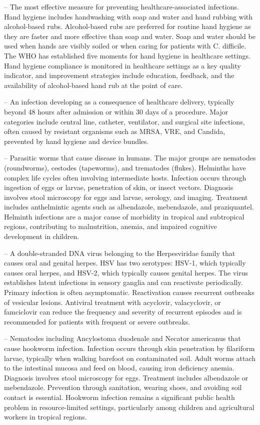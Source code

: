 -- The most effective measure for preventing healthcare-associated infections. Hand hygiene includes handwashing with soap and water and hand rubbing with alcohol-based rubs. Alcohol-based rubs are preferred for routine hand hygiene as they are faster and more effective than soap and water. Soap and water should be used when hands are visibly soiled or when caring for patients with C. difficile. The WHO has established five moments for hand hygiene in healthcare settings. Hand hygiene compliance is monitored in healthcare settings as a key quality indicator, and improvement strategies include education, feedback, and the availability of alcohol-based hand rub at the point of care.

-- An infection developing as a consequence of healthcare delivery, typically beyond 48 hours after admission or within 30 days of a procedure. Major categories include central line, catheter, ventilator, and surgical site infections, often caused by resistant organisms such as MRSA, VRE, and Candida, prevented by hand hygiene and device bundles.

-- Parasitic worms that cause disease in humans. The major groups are nematodes (roundworms), cestodes (tapeworms), and trematodes (flukes). Helminths have complex life cycles often involving intermediate hosts. Infection occurs through ingestion of eggs or larvae, penetration of skin, or insect vectors. Diagnosis involves stool microscopy for eggs and larvae, serology, and imaging. Treatment includes anthelmintic agents such as albendazole, mebendazole, and praziquantel. Helminth infections are a major cause of morbidity in tropical and subtropical regions, contributing to malnutrition, anemia, and impaired cognitive development in children.

-- A double-stranded DNA virus belonging to the Herpesviridae family that causes oral and genital herpes. HSV has two serotypes: HSV-1, which typically causes oral herpes, and HSV-2, which typically causes genital herpes. The virus establishes latent infections in sensory ganglia and can reactivate periodically. Primary infection is often asymptomatic. Reactivation causes recurrent outbreaks of vesicular lesions. Antiviral treatment with acyclovir, valacyclovir, or famciclovir can reduce the frequency and severity of recurrent episodes and is recommended for patients with frequent or severe outbreaks.

-- Nematodes including Ancylostoma duodenale and Necator americanus that cause hookworm infection. Infection occurs through skin penetration by filariform larvae, typically when walking barefoot on contaminated soil. Adult worms attach to the intestinal mucosa and feed on blood, causing iron deficiency anemia. Diagnosis involves stool microscopy for eggs. Treatment includes albendazole or mebendazole. Prevention through sanitation, wearing shoes, and avoiding soil contact is essential. Hookworm infection remains a significant public health problem in resource-limited settings, particularly among children and agricultural workers in tropical regions.

